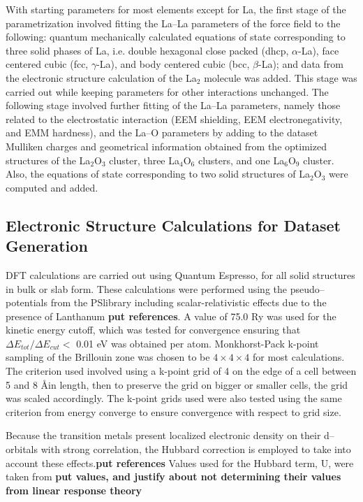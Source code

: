 \documentclass[journal=jpcafh,manuscript=article]{achemso}
\begin{document}
With starting parameters for most elements except for La, the first stage of the parametrization involved fitting the La--La parameters of the force field to the following: quantum mechanically calculated equations of state corresponding to three solid phases of La, i.e. double hexagonal close packed (dhcp, $\alpha$-La), face centered cubic (fcc, $\gamma$-La), and body centered cubic (bcc, $\beta$-La); and data from the electronic structure calculation of the La$_2$ molecule was added.
This stage was carried out while keeping parameters for other interactions unchanged.
The following stage involved further fitting of the La--La parameters, namely those related to the electrostatic interaction (EEM shielding, EEM electronegativity, and EMM hardness), and the La--O parameters by adding to the dataset Mulliken charges and geometrical information obtained from the optimized structures of the La$_2$O$_3$ cluster, three La$_4$O$_6$ clusters, and one La$_6$O$_9$ cluster.
Also, the equations of state corresponding to two solid structures of La$_2$O$_3$ were computed and added.


\subsection{Electronic Structure Calculations for Dataset Generation}

DFT calculations are carried out using Quantum Espresso,\cite{giannozzi_advanced_2017} for all solid structures in bulk or slab form.
These calculations were performed using the pseudo--potentials from the PSlibrary including scalar-relativistic effects due to the presence of Lanthanum \textbf{put references}.
A value of 75.0 Ry was used for the kinetic energy cutoff, which was tested for convergence ensuring that $\Delta E_{tot} / \Delta E_{cut} <$ 0.01 eV was obtained per atom.
Monkhorst-Pack k-point sampling of the Brillouin zone was chosen to be $4\times4\times4$ for most calculations.
The criterion used involved using a k-point grid of 4 on the edge of a cell between 5 and 8 \AA in length, then to preserve the grid on bigger or smaller cells, the grid was scaled accordingly.
The k-point grids used were also tested using the same criterion from energy converge to ensure convergence with respect to grid size.

Because the transition metals present localized electronic density on their d--orbitals with strong correlation, the Hubbard correction is employed to take into account these effects.\textbf{put references}
Values used for the Hubbard term, U, were taken from \textbf{put values, and justify about not determining their values from linear response theory}
\end{document}
